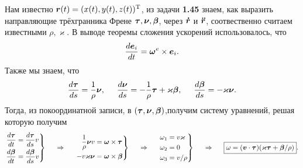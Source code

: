 Нам известно $\mbox{\boldmath $r$}(t) = (x(t), y(t), z(t))^{\text{T}}$, из задачи \textbf{1.45} знаем, как выразить
направляющие трёхгранника Френе $\mbox{\boldmath $\tau$}, \mbox{\boldmath $\nu$}, \mbox{\boldmath $\beta$}$, через $\mbox{\boldmath $\dot{r}$}$ и $\mbox{\boldmath $\ddot{r}$}$, соотвественно считаем известными $\rho, \varkappa$. В выводе теоремы сложения ускорений использовалось, что
\begin{equation}
\label{432_1}
    \frac{d \mbox{\boldmath $e$}_i}{dt} = \mbox{\boldmath $\omega$}^e \times \mbox{\boldmath $e$}_i.
\end{equation}
Также мы знаем, что
\begin{equation}
\label{432_2}
    \frac{d \mbox{\boldmath $\tau$}}{ds} = \frac{1}{\rho} \mbox{\boldmath $\nu$},
    \hspace{0.5cm}
    \frac{d \mbox{\boldmath $\nu$}}{ds} = -\frac{1}{\rho}  \mbox{\boldmath $\tau$} + \varkappa \mbox{\boldmath $\beta$},
    \hspace{0.5cm} 
    \frac{d \mbox{\boldmath $\beta$}}{d s} = - \varkappa \mbox{\boldmath $\nu$}.
\end{equation}
Тогда, из покоординатной записи, в $(\mbox{\boldmath $\tau$}, \mbox{\boldmath $\nu$}, \mbox{\boldmath $\beta$})$,получим систему уравнений, решая которую получим
$$
    \left.\begin{aligned}
        \frac{d \mbox{\boldmath $\tau$}}{dt}  &= \frac{d \mbox{\boldmath $\tau$}}{ds} v \\
        \frac{d \mbox{\boldmath $\beta$}}{d t} &= \frac{d \mbox{\boldmath $\beta$}}{d s} v 
    \end{aligned}\right\}
    \hspace{0.5cm} \Rightarrow \hspace{0.5cm} 
    \left.\begin{aligned}
        \frac{1}{\rho} \mbox{\boldmath $\nu$} v &= \mbox{\boldmath $\omega$} \times \mbox{\boldmath $\tau$} \\
        - v \varkappa \mbox{\boldmath $\nu$} &= \mbox{\boldmath $\omega$} \times \mbox{\boldmath $\beta$}
    \end{aligned}\right\}
    \hspace{0.5cm} \Rightarrow \hspace{0.5cm} 
    \left.\begin{aligned}
        \omega_1 &= v \varkappa \\
        \omega_2 &= 0 \\
        \omega_3 &= v / \rho
    \end{aligned}\right\}
    \hspace{0.5cm} \Rightarrow \hspace{0.5cm} 
    \boxed{
         \omega = (\mbox{\boldmath $v$} \cdot \mbox{\boldmath $\tau$}) (\varkappa \mbox{\boldmath $\tau$} + \mbox{\boldmath $\beta$} / \rho)   
    }.
$$



